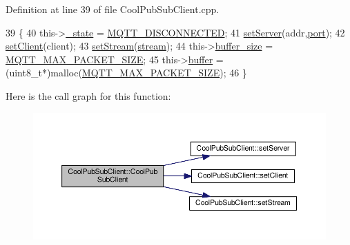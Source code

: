 Definition at line 39 of file Cool\+Pub\+Sub\+Client.\+cpp.


\begin{DoxyCode}
39                                                                                                 \{
40     this->\hyperlink{class_cool_pub_sub_client_aa1953b601206252a30efa5b114eb3e1a}{\_state} = \hyperlink{_cool_pub_sub_client_8h_adaf86a906a305dd129164982d50111b3}{MQTT\_DISCONNECTED};
41     \hyperlink{class_cool_pub_sub_client_a947e70c394c66c7d08d0c53caf8425e3}{setServer}(addr,\hyperlink{class_cool_pub_sub_client_a01e3249102c057756af7a515c179844e}{port});
42     \hyperlink{class_cool_pub_sub_client_a7ee119b786010561ab6a9afa0798e91d}{setClient}(client);
43     \hyperlink{class_cool_pub_sub_client_ae97e40823ea689ff9e36d5bdd71bb933}{setStream}(\hyperlink{class_cool_pub_sub_client_a7a92417b317e7bd9502ed37752111705}{stream});
44     this->\hyperlink{class_cool_pub_sub_client_ae6cb10e42c057483d53516ac830ab526}{buffer\_size} = \hyperlink{_cool_pub_sub_client_8h_ae09b594688a59f1427c7e45259e039b9}{MQTT\_MAX\_PACKET\_SIZE};
45     this->\hyperlink{class_cool_pub_sub_client_a7e8bcc6096626916046a51bebadc7851}{buffer} = (uint8\_t*)malloc(\hyperlink{_cool_pub_sub_client_8h_ae09b594688a59f1427c7e45259e039b9}{MQTT\_MAX\_PACKET\_SIZE});
46 \}
\end{DoxyCode}
Here is the call graph for this function\+:\nopagebreak
\begin{figure}[H]
\begin{center}
\leavevmode
\includegraphics[width=350pt]{d8/d4b/class_cool_pub_sub_client_af8b1aeb169366da52e3289bb6c238b6b_cgraph}
\end{center}
\end{figure}
\mbox{\label{class_cool_pub_sub_client_a1743a9eeef19b3b6ff1db5be8df55a9c}} 
